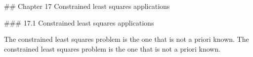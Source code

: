 

## Chapter 17 Constrained least squares applications

### 17.1 Constrained least squares applications

The constrained least squares problem is the one that is not a priori known. The constrained least squares problem is the one that is not a priori known.

